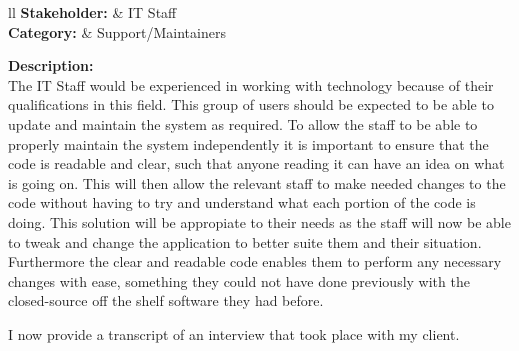 \noindent
\begin{tblr}{ll}
  \textbf{Stakeholder: } & IT Staff\\
  \textbf{Category: } & Support/Maintainers\\
\end{tblr}
\vspace{0.2cm}

\textbf{Description: } \\

The IT Staff would be experienced in working with technology
because of their qualifications in this field. This group of 
users should be expected to be able to update and maintain the 
system as required. To allow the staff to be able to properly 
maintain the system independently it is important to ensure
that the code is readable and clear, such that anyone reading
it can have an idea on what is going on. This will then allow
the relevant staff to make needed changes to the code without
having to try and understand what each portion of the code is
doing. This solution will be appropiate to their needs as the 
staff will now be able to tweak and change the application to 
better suite them and their situation. Furthermore the clear 
and readable code enables them to perform any necessary changes
with ease, something they could not have done previously with 
the closed-source off the shelf software they had before.
\vspace{0.2cm}

I now provide a transcript of an interview that took place 
with my client.

